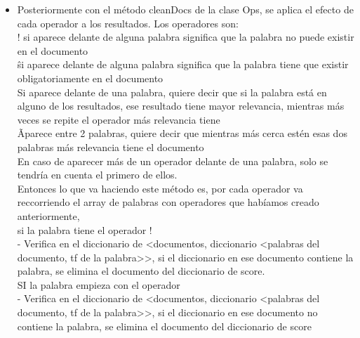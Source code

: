 \documentclass[12pt, a4paper]{article}
\begin{document}
\begin{enumerate}
\begin{itemize}
              \item Posteriormente con el método cleanDocs de la clase Ops,
                    se aplica el efecto de cada operador a los resultados. Los operadores son:\\
                    ! si aparece delante de alguna palabra significa que la palabra
                    no puede existir en el documento\\
                    \^ si aparece delante de alguna palabra significa que la palabra tiene
                    que existir obligatoriamente en el documento\\
                    \* Si aparece delante de una palabra, quiere decir que si la palabra está
                    en alguno de los resultados, ese resultado tiene mayor relevancia,
                    mientras más veces se repite el operador más relevancia tiene\\
                    \~ Aparece entre 2 palabras, quiere decir que mientras más cerca estén esas
                    dos palabras más relevancia tiene el documento\\
                    En caso de aparecer más de un operador delante de una palabra,
                    solo se tendría en cuenta el primero de ellos.\\
                    Entonces lo que va haciendo este método es, por cada operador va reccorriendo
                    el array de palabras con operadores que habíamos creado anteriormente, \\

                    si la palabra tiene el operador !\\
                        - Verifica en el diccionario de
                              <documentos, diccionario <palabras del documento, tf de la palabra>>,
                              si el diccionario en ese documento contiene la palabra,
                              se elimina el documento del diccionario de score.\\

                    SI la palabra empieza con el operador \^\\
                    - Verifica en el diccionario de
                              <documentos, diccionario <palabras del documento, tf de la palabra>>,
                              si el diccionario en ese documento no contiene la palabra,
                              se elimina el documento del diccionario de score\\


\end{itemize}
\end{enumerate}
\end{document}
